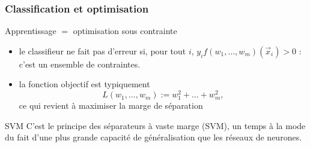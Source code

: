 \begin{frame}
  \frametitle{Classification et optimisation}

  \begin{block}{Apprentissage $=$ optimisation sous contrainte}

    \begin{itemize}
    \item le classifieur ne fait pas d'erreur si, pour tout $i$,
      $y_i f(w_1, \dots, w_m)(\vec{x}_i) > 0$ : c'est un ensemble
      de contraintes.
    \item la fonction objectif est typiquement 
      \[ L(w_1, \dots, w_m) := w_1^2 + \dots + w_m^2, \]
      ce qui revient à maximiser la marge de séparation
    \end{itemize}
  \end{block}

  \begin{block}{SVM}
    C'est le principe des séparateurs à vaste marge (SVM),
    un temps à la mode du fait d'une plus grande capacité de
    généralisation que les réseaux de neurones. 
  \end{block}
      
\end{frame}
